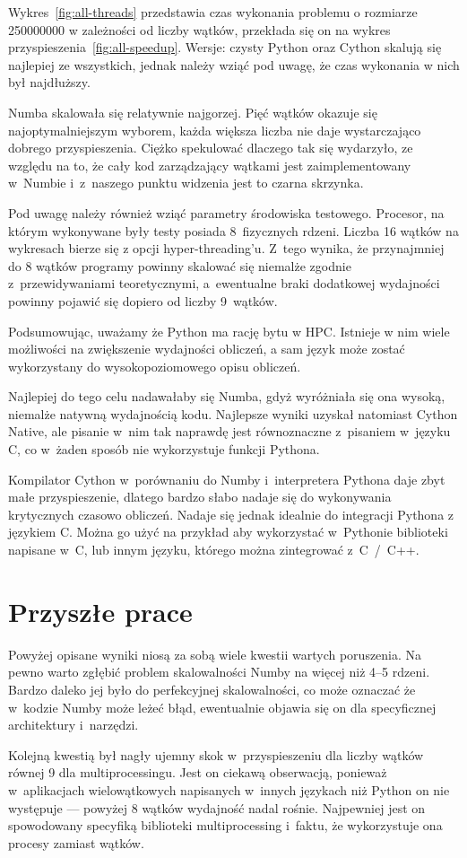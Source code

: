 Wykres~\ref{fig:all-threads} przedstawia czas wykonania problemu o rozmiarze
250000000 w zależności od liczby wątków,
przekłada się on na wykres przyspieszenia~\ref{fig:all-speedup}.
Wersje: czysty Python oraz Cython skalują się najlepiej ze wszystkich,
jednak należy wziąć pod uwagę, że czas wykonania w nich był najdłuższy.

Numba skalowała się relatywnie najgorzej.
Pięć wątków okazuje się najoptymalniejszym wyborem,
każda większa liczba nie daje wystarczająco dobrego przyspieszenia.
Ciężko spekulować dlaczego tak się wydarzyło, ze względu na to,
że cały kod zarządzający wątkami jest zaimplementowany w~Numbie
i~z~naszego punktu widzenia jest to czarna skrzynka.

Pod uwagę należy również wziąć parametry środowiska testowego.
Procesor, na którym wykonywane były testy posiada 8~fizycznych rdzeni.
Liczba 16 wątków na wykresach bierze się z opcji hyper-threading'u.
Z~tego wynika, że przynajmniej do 8 wątków programy powinny skalować się
niemalże zgodnie z~przewidywaniami teoretycznymi, a~ewentualne braki
dodatkowej wydajności powinny pojawić się dopiero od liczby 9~wątków.

Podsumowując, uważamy że Python ma rację bytu w HPC\@.
Istnieje w nim wiele możliwości na zwiększenie wydajności obliczeń,
a sam język może zostać wykorzystany do wysokopoziomowego opisu obliczeń.

Najlepiej do tego celu nadawałaby się Numba, gdyż wyróżniała się ona
wysoką, niemalże natywną wydajnością kodu.
Najlepsze wyniki uzyskał natomiast Cython Native,
ale pisanie w~nim tak naprawdę jest równoznaczne z~pisaniem w~języku C,
co w~żaden sposób nie wykorzystuje funkcji Pythona.

Kompilator Cython w~porównaniu do Numby i~interpretera Pythona daje zbyt
małe przyspieszenie, dlatego bardzo słabo nadaje się do wykonywania
krytycznych czasowo obliczeń.
Nadaje się jednak idealnie do integracji Pythona z językiem C\@.
Można go użyć na przykład aby wykorzystać w~Pythonie biblioteki napisane w~C,
lub innym języku, którego można zintegrować z~C~/~C++\@.


\section{Przyszłe prace}

Powyżej opisane wyniki niosą za sobą wiele kwestii wartych poruszenia.
Na pewno warto zgłębić problem skalowalności Numby na więcej niż 4--5
rdzeni.
Bardzo daleko jej było do perfekcyjnej skalowalności,
co może oznaczać że w~kodzie Numby może leżeć błąd,
ewentualnie objawia się on dla specyficznej architektury i~narzędzi.

Kolejną kwestią był nagły ujemny skok w~przyspieszeniu dla
liczby wątków równej 9 dla multiprocessingu.
Jest on ciekawą obserwacją, ponieważ w~aplikacjach wielowątkowych
napisanych w~innych językach niż Python on nie występuje ---
powyżej 8 wątków wydajność nadal rośnie.
Najpewniej jest on spowodowany specyfiką biblioteki multiprocessing
i~faktu, że wykorzystuje ona procesy zamiast wątków.
